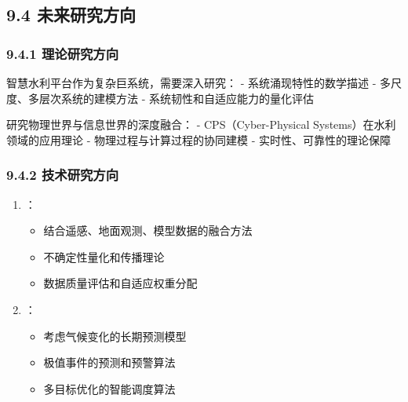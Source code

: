 \hypertarget{ux672aux6765ux7814ux7a76ux65b9ux5411}{%
\subsection{9.4 未来研究方向}\label{ux672aux6765ux7814ux7a76ux65b9ux5411}}

\hypertarget{ux7406ux8bbaux7814ux7a76ux65b9ux5411}{%
\subsubsection{9.4.1 理论研究方向}\label{ux7406ux8bbaux7814ux7a76ux65b9ux5411}}


智慧水利平台作为复杂巨系统，需要深入研究： - 系统涌现特性的数学描述 - 多尺度、多层次系统的建模方法 - 系统韧性和自适应能力的量化评估


研究物理世界与信息世界的深度融合： - CPS（Cyber-Physical Systems）在水利领域的应用理论 - 物理过程与计算过程的协同建模 - 实时性、可靠性的理论保障

\hypertarget{ux6280ux672fux7814ux7a76ux65b9ux5411}{%
\subsubsection{9.4.2 技术研究方向}\label{ux6280ux672fux7814ux7a76ux65b9ux5411}}


\begin{enumerate}
\def\labelenumi{\arabic{enumi}.}
\tightlist
\item
  ：

  \begin{itemize}
  \tightlist
  \item
    结合遥感、地面观测、模型数据的融合方法
  \item
    不确定性量化和传播理论
  \item
    数据质量评估和自适应权重分配
  \end{itemize}
\item
  ：

  \begin{itemize}
  \tightlist
  \item
    考虑气候变化的长期预测模型
  \item
    极值事件的预测和预警算法
  \item
    多目标优化的智能调度算法
  \end{itemize}
\end{enumerate}

